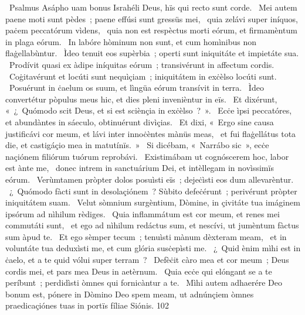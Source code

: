 {~Psalmus Asápho}
{%
uam bonus Israhéli Deus, hïs qui recto sunt corde.
~Mei autem paene moti sunt pèdes~; paene effúsi sunt gressüs mei,
~quia zelávi super iníquos, paċem peccatórum vìdens,
~quia non est respèctus morti eórum, et firmamèntum in plaga eórum.
~In labóre hòminum non sunt, et cum homìnibus non flaġellabùntur.
~Ìdeo tenuit eos supèrbia~; operti sunt iniquitáte et impietáte sua.
~Prodívit quasi ex àdipe iníquitas eórum~; transivérunt in affectum cordis.
~Coġitavérunt et locúti sunt nequìçiam~; iniquitátem in exċèlso locúti sunt.
~Posuérunt in ċaelum os suum, et lìngüa eórum transívit in terra.
~Ìdeo convertétur pòpulus meus hic, et dies pleni invenièntur in eïs.
~Et dixérunt, «~¿~Quómodo scit Deus, et si est sciènçia in exċèlso~?~».
~Ecċe ìpsi peccatóres, et abundàntes in sáeculo, obtinuérunt divìçias.
~Et dixi, «~Ergo sine causa justificávi cor meum, et lávi inter innoċèntes mànüs meas,
~et fui flaġellátus tota die, et castigáçio mea in matutínïs.~»
~Si dicébam, «~Narrábo sic~», ecċe naçiónem filiórum tuórum reprobávi.
~Existimábam ut cognóscerem hoc, labor est ànte me,
~donec intrem in sanctuárium Dei, et intèllegam in novìssimïs eórum.
~Verùmtamen pròpter dolos posuìsti eïs~; dejeċìsti eos dum allevarèntur.
~¿~Quómodo fàcti sunt in desolaçiónem~? Sùbito defeċérunt~; perivérunt pròpter iniquitátem suam.
~Velut sòmnium surgèntium, Dòmine, in çivitáte tua imáginem ipsórum ad nìhilum rèdiges.
~Quia inflammátum est cor meum, et renes mei commutáti sunt,
~et ego ad nìhilum redáctus sum, et nescívi, ut jumèntum fàctus sum àpud te.
~Et ego sèmper tecum~; tenuìsti mànum dèxteram meam,
~et in voluntáte tua deduxìsti me, et cum glória susċepìsti me.
~¿~Quid ènim mìhi est in ċaelo, et a te quid vólui super terram~?
~Defèċit càro mea et cor meum~; Deus cordis mei, et pars mea Deus in aetèrnum.
~Quia ecċe qui elóngant se a te períbunt~; perdidìsti òmnes qui fornicàntur a te.
~Mìhi autem adhaerére Deo bonum est, pónere in Dòmino Deo spem meam, ut adnúnçiem òmnes praedicaçiónes tuas in portïs fíliae Siónis.}
{10}{2}
